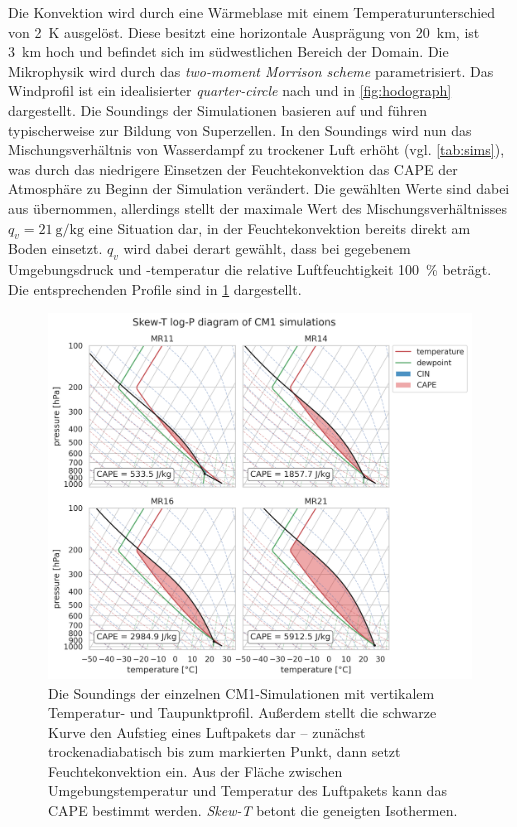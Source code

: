 Die Konvektion wird durch eine Wärmeblase mit einem Temperaturunterschied von \SI{2}{\K} ausgelöst. Diese besitzt eine horizontale Ausprägung von \SI{20}{\km}, ist \SI{3}{\km} hoch und befindet sich im südwestlichen Bereich der Domain. Die Mikrophysik wird durch das \textit{two-moment Morrison scheme} \parencite{morrison2005} parametrisiert. Das Windprofil ist ein idealisierter \textit{quarter-circle} nach \textcite{weisman2000} und in \cref{fig:hodograph} dargestellt. Die Soundings der Simulationen basieren auf \textcite{weisman1982} und führen typischerweise zur Bildung von Superzellen. In den Soundings wird nun das Mischungsverhältnis von Wasserdampf zu trockener Luft erhöht (vgl. \cref{tab:sims}), was durch das niedrigere Einsetzen der Feuchtekonvektion das CAPE der Atmosphäre zu Beginn der Simulation verändert. Die gewählten Werte sind dabei aus \textcite{weisman1982} übernommen, allerdings stellt der maximale Wert des Mischungsverhältnisses \(q_v = \SI{21}{\g\per\kg}\) eine Situation dar, in der Feuchtekonvektion bereits direkt am Boden einsetzt. \(q_v\) wird dabei derart gewählt, dass bei gegebenem Umgebungsdruck und -temperatur die relative Luftfeuchtigkeit \SI{100}{\percent} beträgt. Die entsprechenden Profile sind in \cref{fig:sounding} dargestellt.

\begin{figure}
	\centering
	\includegraphics[width=\linewidth]{../figs/sounding.png}
	\caption{Die Soundings der einzelnen CM1-Simulationen mit vertikalem Temperatur- und Taupunktprofil. Außerdem stellt die schwarze Kurve den Aufstieg eines Luftpakets dar -- zunächst trockenadiabatisch bis zum markierten Punkt, dann setzt Feuchtekonvektion ein. Aus der Fläche zwischen Umgebungstemperatur und Temperatur des Luftpakets kann das CAPE bestimmt werden. \textit{Skew-T} betont die geneigten Isothermen.}
	\label{fig:sounding}
\end{figure}
